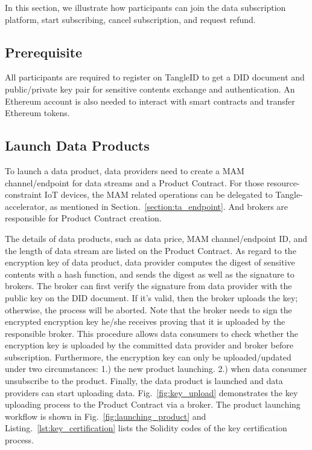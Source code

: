 \begin{spacing}{2.0}
\label{section:trading_model}
In this section, we illustrate how participants can join the data subscription platform, start subscribing, cancel subscription, and request refund.

\subsection{Prerequisite}
All participants are required to register on TangleID to get a DID document and public/private key pair for sensitive contents exchange and authentication. An Ethereum account is also needed to interact with smart contracts and transfer Ethereum tokens.

\subsection{Launch Data Products}
\label{section:launch_data_product}
To launch a data product, data providers need to create a MAM channel/endpoint for data streams and a Product Contract. For those resource-constraint IoT devices, the MAM related operations can be delegated to Tangle-accelerator, as mentioned in Section.~\ref{section:ta_endpoint}. And brokers are responsible for Product Contract creation.

The details of data products, such as data price, MAM channel/endpoint ID, and the length of data stream are listed on the Product Contract. As regard to the encryption key of data product, data provider computes the digest of sensitive contents with a hash function, and sends the digest as well as the signature to brokers. The broker can first verify the signature from data provider with the public key on the DID document. If it's valid, then the broker uploads the key; otherwise, the process will be aborted. Note that the broker needs to sign the encrypted encryption key he/she receives proving that it is uploaded by the responsible broker. This procedure allows data consumers to check whether the encryption key is uploaded by the committed data provider and broker before subscription. Furthermore, the encryption key can only be uploaded/updated under two circumstances: 1.) the new product launching. 2.) when data consumer unsubscribe to the product. Finally, the data product is launched and data providers can start uploading data. Fig.~\ref{fig:key_upload} demonstrates the key uploading process to the Product Contract via a broker. The product launching workflow is shown in Fig.~\ref{fig:launching_product} and Listing.~\ref{lst:key_certification} lists the Solidity codes of the key certification process.
\clearpage


\end{spacing}
